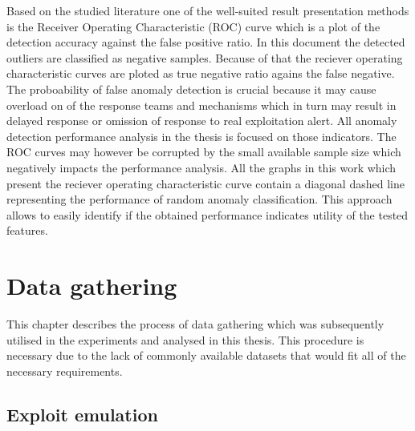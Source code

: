\documentclass[a4paper,twoside,12pt]{book}
\begin{document}
Based on the studied literature one of the well-suited result presentation methods is the Receiver 
Operating Characteristic (ROC) curve which is a plot of the detection accuracy against the false 
positive ratio. In this document the detected outliers are classified as negative samples. Because 
of that the reciever operating characteristic curves are ploted as true negative ratio agains the 
false negative. The proboability of false anomaly detection is crucial because it may cause overload
on of the response teams and mechanisms which in turn may result in delayed response or omission
of response to real exploitation alert. All anomaly detection performance analysis in the thesis is focused
on those indicators. The ROC curves may however be corrupted by the small available sample size 
which negatively impacts the performance analysis. All the graphs in this work which present
the reciever operating characteristic curve contain a diagonal dashed line representing the
performance of random anomaly classification. This approach allows to easily identify if the obtained
performance indicates utility of the tested features.



\chapter{Data gathering}
This chapter describes the process of data gathering which was subsequently utilised in the experiments and 
analysed in this thesis. This procedure is necessary due to the lack of commonly available 
datasets that would fit all of the necessary requirements. 

\section{Exploit emulation}
\end{document}
